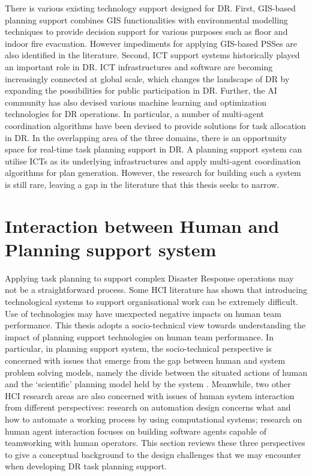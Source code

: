 There is various existing technology support designed for \ac{DR}. First, \ac{GIS}-based planning support combines \ac{GIS} functionalities with environmental modelling techniques to provide decision support for various purposes such as floor and indoor fire evacuation. However impediments for applying \ac{GIS}-based \ac{PSS}es are also identified in the literature. Second, \ac{ICT} support systems historically played an important role in \ac{DR}.  \ac{ICT} infrastructures and software are becoming increasingly connected at global scale, which changes the landscape of \ac{DR} by expanding the possibilities for public participation in \ac{DR}. Further, the \ac{AI} community has also devised various machine learning and optimization technologies for \ac{DR} operations. In particular, a number of multi-agent coordination algorithms have been devised to provide solutions for task allocation in \ac{DR}. In the overlapping area of the three domains, there is an opportunity space for real-time task planning support in \ac{DR}. A planning support system can utilise \ac{ICT}s as its underlying infrastructures and apply multi-agent coordination algorithms for plan generation. However, the research for building such a system is still rare, leaving a gap in the literature that this thesis seeks to narrow.\\

\chapter{Interaction between Human and Planning support system}\label{ch:humanSysRelationship}

Applying task planning to support complex Disaster Response operations may not be a straightforward process. Some \ac{HCI} literature \citep{Ackerman2000,Bowers1994,Niazkhani2009} has shown that introducing technological systems to support organisational work can be extremely difficult. Use of technologies may have unexpected negative impacts on human team performance. This thesis adopts a socio-technical view towards understanding the impact of planning support technologies on human team performance. In particular, in planning support system, the socio-technical perspective is concerned with issues that emerge from the gap between human and system problem solving models, namely the divide between the situated actions of human and the `scientific' planning model held by the system \citep{Suchman1987}. Meanwhile, two other \ac{HCI} research areas are also concerned with issues of human system interaction from different perspectives: research on automation design concerns what and how to automate a working process by using computational systems; research on human agent interaction focuses on building software agents capable of teamworking with human operators. This section reviews these three perspectives to give a conceptual background to the design challenges that we may encounter when developing \ac{DR} task planning support.\\

